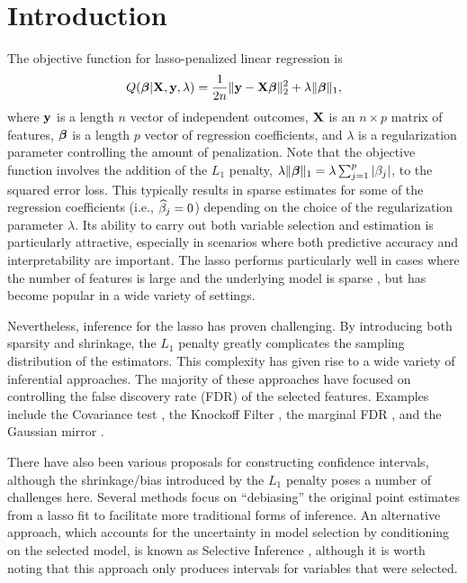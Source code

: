 \section{Introduction}

The objective function for lasso-penalized linear regression \citep{Tibshirani1996} is
$$Q(\boldsymbol{\beta}|\mathbf{X},\mathbf{y},\lambda) = \frac{1}{2n}\lVert\mathbf{y} - \mathbf{X}\boldsymbol{\beta}\rVert_2^2 + \lambda\lVert\boldsymbol{\beta}\rVert_1,$$
where $\mathbf{y}$ is a length $n$ vector of independent outcomes, $\mathbf{X}$ is an $n \times p$ matrix of features, $\boldsymbol{\beta}$ is a length $p$ vector of regression coefficients, and $\lambda$ is a regularization parameter controlling the amount of penalization. Note that the objective function involves the addition of the $L_1$ penalty, $\lambda\lVert\boldsymbol{\beta}\rVert_1 = \lambda \sum_{j = 1}^p |\beta_j|$, to the squared error loss. This typically results in sparse estimates for some of the regression coefficients (i.e., $\widehat{\beta}_j = 0$) depending on the choice of the regularization parameter $\lambda$. Its ability to carry out both variable selection and estimation is particularly attractive, especially in scenarios where both predictive accuracy and interpretability are important. The lasso performs particularly well in cases where the number of features is large and the underlying model is sparse \citep{HTF2009}, but has become popular in a wide variety of settings.

Nevertheless, inference for the lasso has proven challenging. By introducing both sparsity and shrinkage, the $L_1$ penalty greatly complicates the sampling distribution of the estimators. This complexity has given rise to a wide variety of inferential approaches. The majority of these approaches have focused on controlling the false discovery rate (FDR) of the selected features. Examples include the Covariance test \citep{Lockhart2014}, the Knockoff Filter \citep{Candes2015,Candes2018}, the marginal FDR \citep{Breheny2019}, and the Gaussian mirror \citep{Xing2023}.

There have also been various proposals for constructing confidence intervals, although the shrinkage/bias introduced by the $L_1$ penalty poses a number of challenges here. Several methods \citep{ZhangZhang2014, Javanmard2014} focus on ``debiasing'' the original point estimates from a lasso fit to facilitate more traditional forms of inference. An alternative approach, which accounts for the uncertainty in model selection by conditioning on the selected model, is known as Selective Inference \citep{Lee2016}, although it is worth noting that this approach only produces intervals for variables that were selected.

